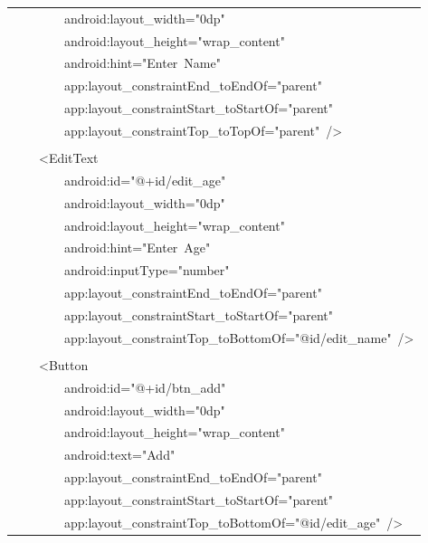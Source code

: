 \documentclass[a4paper,12pt]{article}
\begin{document}
\begin{longtable}{|p{}|}
{\ttfamily\small \ \ \ \ \ \ \ \ android:layout\_width="0dp"} \\
{\ttfamily\small \ \ \ \ \ \ \ \ android:layout\_height="wrap\_content"} \\
{\ttfamily\small \ \ \ \ \ \ \ \ android:hint="Enter\ Name"} \\
{\ttfamily\small \ \ \ \ \ \ \ \ app:layout\_constraintEnd\_toEndOf="parent"} \\
{\ttfamily\small \ \ \ \ \ \ \ \ app:layout\_constraintStart\_toStartOf="parent"} \\
{\ttfamily\small \ \ \ \ \ \ \ \ app:layout\_constraintTop\_toTopOf="parent"\ /\textgreater{}} \\
\strut \\
{\ttfamily\small \ \ \ \ \textless{}EditText} \\
{\ttfamily\small \ \ \ \ \ \ \ \ android:id="@+id/edit\_age"} \\
{\ttfamily\small \ \ \ \ \ \ \ \ android:layout\_width="0dp"} \\
{\ttfamily\small \ \ \ \ \ \ \ \ android:layout\_height="wrap\_content"} \\
{\ttfamily\small \ \ \ \ \ \ \ \ android:hint="Enter\ Age"} \\
{\ttfamily\small \ \ \ \ \ \ \ \ android:inputType="number"} \\
{\ttfamily\small \ \ \ \ \ \ \ \ app:layout\_constraintEnd\_toEndOf="parent"} \\
{\ttfamily\small \ \ \ \ \ \ \ \ app:layout\_constraintStart\_toStartOf="parent"} \\
{\ttfamily\small \ \ \ \ \ \ \ \ app:layout\_constraintTop\_toBottomOf="@id/edit\_name"\ /\textgreater{}} \\
\strut \\
{\ttfamily\small \ \ \ \ \textless{}Button} \\
{\ttfamily\small \ \ \ \ \ \ \ \ android:id="@+id/btn\_add"} \\
{\ttfamily\small \ \ \ \ \ \ \ \ android:layout\_width="0dp"} \\
{\ttfamily\small \ \ \ \ \ \ \ \ android:layout\_height="wrap\_content"} \\
{\ttfamily\small \ \ \ \ \ \ \ \ android:text="Add"} \\
{\ttfamily\small \ \ \ \ \ \ \ \ app:layout\_constraintEnd\_toEndOf="parent"} \\
{\ttfamily\small \ \ \ \ \ \ \ \ app:layout\_constraintStart\_toStartOf="parent"} \\
{\ttfamily\small \ \ \ \ \ \ \ \ app:layout\_constraintTop\_toBottomOf="@id/edit\_age"\ /\textgreater{}} \\

\end{longtable}
\end{document}
